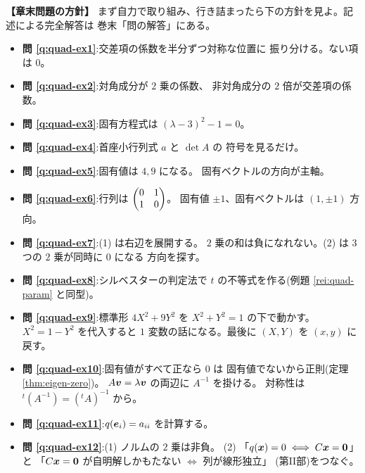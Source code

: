 \bigskip
{\small
\noindent\textbf{【章末問題の方針】}\quad
まず自力で取り組み、行き詰まったら下の方針を見よ。記述による完全解答は
巻末「問の解答」にある。
\begin{itemize}
\item \textbf{問 \ref{q:quad-ex1}}:交差項の係数を半分ずつ対称な位置に
振り分ける。ない項は $0$。
\item \textbf{問 \ref{q:quad-ex2}}:対角成分が $2$ 乗の係数、
非対角成分の $2$ 倍が交差項の係数。
\item \textbf{問 \ref{q:quad-ex3}}:固有方程式は
$(\lambda - 3)^2 - 1 = 0$。
\item \textbf{問 \ref{q:quad-ex4}}:首座小行列式 $a$ と $\det A$ の
符号を見るだけ。
\item \textbf{問 \ref{q:quad-ex5}}:固有値は $4, 9$ になる。
固有ベクトルの方向が主軸。
\item \textbf{問 \ref{q:quad-ex6}}:行列は $\begin{pmatrix}0 & 1 \\ 1 & 0\end{pmatrix}$。
固有値 $\pm 1$、固有ベクトルは $(1, \pm 1)$ 方向。
\item \textbf{問 \ref{q:quad-ex7}}:(1) は右辺を展開する。
$2$ 乗の和は負になれない。(2) は $3$ つの $2$ 乗が同時に $0$ になる
方向を探す。
\item \textbf{問 \ref{q:quad-ex8}}:シルベスターの判定法で
$t$ の不等式を作る(例題 \ref{rei:quad-param} と同型)。
\item \textbf{問 \ref{q:quad-ex9}}:標準形 $4X^2 + 9Y^2$ を
$X^2 + Y^2 = 1$ の下で動かす。$X^2 = 1 - Y^2$ を代入すると
$1$ 変数の話になる。最後に $(X, Y)$ を $(x, y)$ に戻す。
\item \textbf{問 \ref{q:quad-ex10}}:固有値がすべて正なら $0$ は
固有値でないから正則(定理 \ref{thm:eigen-zero})。
$A\bm{v} = \lambda\bm{v}$ の両辺に $A^{-1}$ を掛ける。
対称性は ${}^t(A^{-1}) = ({}^t\!A)^{-1}$ から。
\item \textbf{問 \ref{q:quad-ex11}}:$q(\bm{e}_i) = a_{ii}$ を計算する。
\item \textbf{問 \ref{q:quad-ex12}}:(1) ノルムの $2$ 乗は非負。
(2) 「$q(\bm{x}) = 0 \iff C\bm{x} = \bm{0}$」と
「$C\bm{x} = \bm{0}$ が自明解しかもたない $\iff$ 列が線形独立」
(第II部)をつなぐ。
\end{itemize}
}

